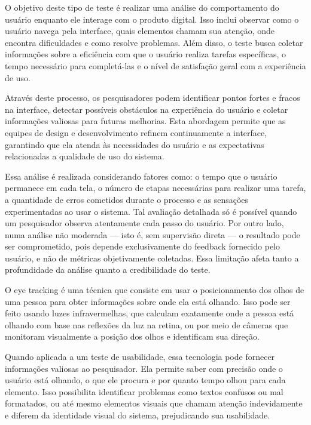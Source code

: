 O objetivo deste tipo de teste é realizar uma análise do comportamento do usuário enquanto ele interage com o produto digital. Isso inclui observar como o usuário navega pela interface, quais elementos chamam sua atenção, onde encontra dificuldades e como resolve problemas. Além disso, o teste busca coletar informações sobre a eficiência com que o usuário realiza tarefas específicas, o tempo necessário para completá-las e o nível de satisfação geral com a experiência de uso.

Através deste processo, os pesquisadores podem identificar pontos fortes e fracos na interface, detectar possíveis obstáculos na experiência do usuário e coletar informações valiosas para futuras melhorias. Esta abordagem permite que as equipes de design e desenvolvimento refinem continuamente a interface, garantindo que ela atenda às necessidades do usuário e as expectativas relacionadas a qualidade de uso do sistema.

Essa análise é realizada considerando fatores como: o tempo que o usuário permanece em cada tela, o número de etapas necessárias para realizar uma tarefa, a quantidade de erros cometidos durante o processo e as sensações experimentadas ao usar o sistema. Tal avaliação detalhada só é possível quando um pesquisador observa atentamente cada passo do usuário. Por outro lado, numa análise não moderada — isto é, sem supervisão direta — o resultado pode ser comprometido, pois depende exclusivamente do feedback fornecido pelo usuário, e não de métricas objetivamente coletadas. Essa limitação afeta tanto a profundidade da análise quanto a credibilidade do teste.

\textcite{BELISIARIO2023, VIEIRA2019}


O eye tracking é uma técnica que consiste em usar o posicionamento dos olhos de uma pessoa para obter informações sobre onde ela está olhando. Isso pode ser feito usando luzes infravermelhas, que calculam exatamente onde a pessoa está olhando com base nas reflexões da luz na retina, ou por meio de câmeras que monitoram visualmente a posição dos olhos e identificam sua direção.

Quando aplicada a um teste de usabilidade, essa tecnologia pode fornecer informações valiosas ao pesquisador. Ela permite saber com precisão onde o usuário está olhando, o que ele procura e por quanto tempo olhou para cada elemento. Isso possibilita identificar problemas como textos confusos ou mal formatados, ou até mesmo elementos visuais que chamam atenção indevidamente e diferem da identidade visual do sistema, prejudicando sua usabilidade.

